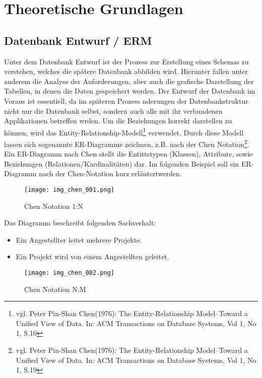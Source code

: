 \chapter{Theoretische Grundlagen}
\label{cha:theogrund}

\section{Datenbank Entwurf / ERM}
\label{sec:erm}

Unter dem Datenbank Entwurf ist der Prozess zur Erstellung eines Schemas zu verstehen, welches die spätere Datenbank abbilden wird.
Hierunter fallen unter anderem die Analyse der Anforderungen, aber auch die grafische Darstellung der Tabellen, in denen die Daten gespeichert werden.
Der Entwurf der Datenbank im Voraus ist essentiell, da im späteren Prozess nderungen der Datenbankstruktur nicht nur die Datenbank selbst, sondern auch alle mit ihr verbundenen Applikationen betreffen wrden.
Um die Beziehungen korrekt darstellen zu können, wird das Entity-Relationship-Modell\footnote{vgl. Peter Pin-Shan Chen(1976): The Entity-Relationship Model--Toward a Unified View of Data. In: ACM Transactions on Database Systems, Vol 1, No 1, S.10} verwendet.
Durch diese Modell lassen sich sogenannte ER-Diagramme zeichnen, z.B. nach der Chen Notation\footnote{vgl. Peter Pin-Shan Chen(1976): The Entity-Relationship Model--Toward a Unified View of Data. In: ACM Transactions on Database Systems, Vol 1, No 1, S.19}.
Ein ER-Diagramm nach Chen stellt die Entittstypen (Klassen), Attribute, sowie Beziehungen (Relationen/Kardinalitäten) dar.
Im folgenden Beispiel soll ein ER-Diagramm nach der Chen-Notation kurz erläutertwerden.

\begin{figure}[H]
\begin{center}
\texttt{[image: img\_chen\_001.png]}
\caption{Chen Notation 1:N}
\label{chenpic1}
\end{center}
\end{figure}


Das Diagramm beschreibt folgenden Sachverhalt:

\begin{itemize}
\item Ein Angestellter leitet mehrere Projekte.
\item Ein Projekt wird von einem Angestellten geleitet.
\end{itemize}

\begin{figure}[H]
\begin{center}
\texttt{[image: img\_chen\_002.png]}
\caption{Chen Notation N:M}
\label{chenpic2}
\end{center}
\end{figure}

